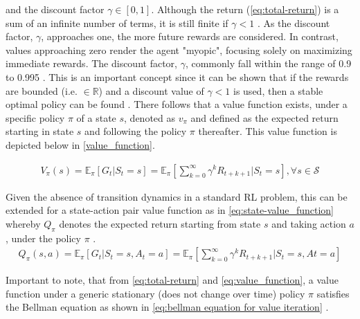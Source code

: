 and the discount factor $\gamma \in [0,1]$. Although the return (\autoref{eq:total-return}) is a sum of an infinite number of terms, it is still finite if $\gamma < 1$ \cite{suttonReinforcementLearningIntroduction2014}. As the discount factor, $\gamma$, approaches one, the more future rewards are considered.  In contrast, values approaching zero render the agent "myopic", focusing solely on maximizing immediate rewards. The discount factor, $\gamma$, commonly fall within the range of 0.9 to 0.995 \cite{vandenbemdRobustDeepReinforcement}. This is an important concept since it can be shown that if the rewards are bounded (i.e. $\in \mathbb{R}$) and a discount value of $\gamma <1$ is used, then a stable optimal policy can be found \cite{bertsekasNewtonMethodReinforcement2022}. There follows that a value function exists, under a specific policy $\pi$ of a state $s$, denoted as $v_{\pi}$ and defined as the expected return starting in state $s$ and following the policy $\pi$ thereafter. This value function is depicted below in \autoref{value_function}.

\begin{equation}
	\begin{aligned}
		V_{\pi}(s) =  \mathbb{E}_{\pi}\left[{G_t | S_t = s}\right] =  \mathbb{E}_{\pi} 
		\left [\sum_{k=0}^{\infty} \gamma^k R_{t+k+1} | S_t = s \right], \forall s \in \mathcal{S} 
	\end{aligned}
	\label{eq:value_function}
\end{equation}

Given the absence of transition dynamics in a standard RL problem, this can be extended for a state-action pair value function as in \autoref{eq:state-value_function} whereby $Q_{\pi}$ denotes the expected return starting from state $s$ and taking action $a$, under the policy $\pi$ \cite{ajagekarDeepReinforcementLearning2022}.
\begin{equation}
	\begin{aligned}
		Q_{\pi}(s,a) =  \mathbb{E}_{\pi}\left[{G_t | S_t = s, A_t = a}\right] =  \mathbb{E}_{\pi}\left[\sum_{k=0}^{\infty} \gamma^k R_{t+k+1} | S_t = s, At = a\right]
	\end{aligned}
	\label{eq:state-value_function}
\end{equation}

Important to note, that from \autoref{eq:total-return} and \autoref{eq:value_function}, a value function under a generic stationary (does not change over time) policy $\pi$ satisfies the Bellman equation as shown in \autoref{eq:bellman equation for value iteration} \cite{bertsekasNewtonMethodReinforcement2022,bellmanDynamicProgramming1966}.


